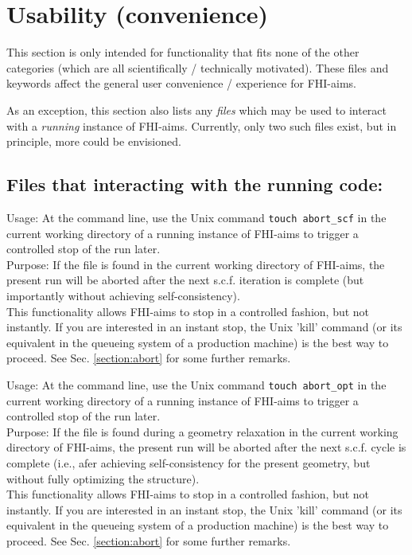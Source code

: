 

 \section{Usability (convenience)}
\label{section:usability}

This section is only intended for functionality that fits none of the
other categories (which are all scientifically / technically
motivated). These files and keywords affect the general user
convenience / experience for FHI-aims.

As an exception, this section also lists any \emph{files}
which may be used to interact with a \emph{running} instance of
FHI-aims. Currently, only two such files exist, but in principle, more
could be envisioned.

\subsection*{Files that interacting with the running code:}

{
  \noindent
  Usage: At the command line, use the Unix command \texttt{touch
    abort\_scf} in the current working directory of a running instance
    of FHI-aims to trigger a controlled stop of the run later. \\[1.0ex] 
  Purpose: If the file  is found in the current
  working directory of FHI-aims, the present run will be aborted after
  the next s.c.f. iteration is complete (but importantly without
  achieving self-consistency). \\
}
This functionality allows FHI-aims to stop in a controlled fashion,
but not instantly. If you are interested in an instant stop, the Unix
'kill' command (or its equivalent in the queueing system of a
production machine) is the best way to proceed. See
Sec. \ref{section:abort} for some further remarks.

{
  \noindent
  Usage: At the command line, use the Unix command \texttt{touch
    abort\_opt} in the current working directory of a running instance
    of FHI-aims to trigger a controlled stop of the run later. \\[1.0ex] 
  Purpose: If the file  is found during a geometry
  relaxation in the current working directory of FHI-aims, the present
  run will be aborted after the next s.c.f. cycle is complete (i.e.,
  afer achieving self-consistency for the present geometry, but
  without fully optimizing the structure). \\
}
This functionality allows FHI-aims to stop in a controlled fashion,
but not instantly. If you are interested in an instant stop, the Unix
'kill' command (or its equivalent in the queueing system of a
production machine) is the best way to proceed. See
Sec. \ref{section:abort} for some further remarks.

